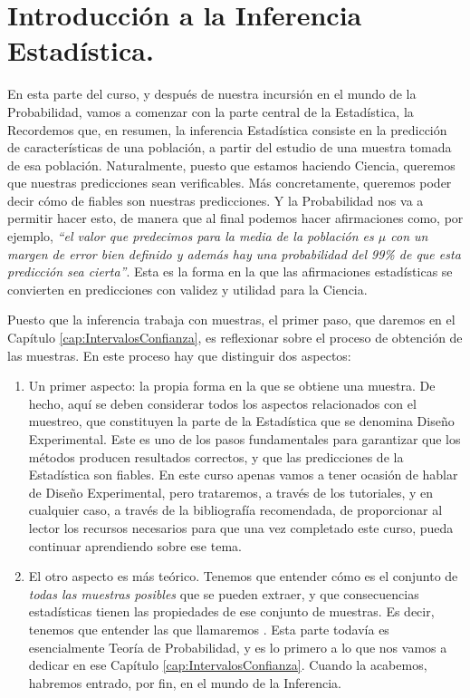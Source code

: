 
\section*{Introducción a la Inferencia Estadística.}
\label{part03:intro}


En esta parte del curso, y después de nuestra incursión en el mundo de la Probabilidad, vamos a comenzar con la parte central de la Estadística, la  Recordemos que, en resumen, la inferencia Estadística consiste en la predicción de características de una población, a partir del estudio de una muestra tomada de esa población. Naturalmente, puesto que estamos haciendo Ciencia, queremos que nuestras predicciones sean verificables. Más concretamente, queremos poder decir cómo de fiables son nuestras predicciones. Y la Probabilidad nos va a permitir hacer esto, de manera que al final podemos hacer afirmaciones como, por ejemplo, {\em ``el valor que predecimos para la media de la población es $\mu$ {\sf con un margen de error bien definido y además hay una probabilidad del 99\% de que esta predicción sea cierta}''}. Esta es la forma en la que las afirmaciones estadísticas se convierten en predicciones con validez y utilidad para la Ciencia.

Puesto que la inferencia trabaja con muestras, el primer paso, que daremos en el Capítulo \ref{cap:IntervalosConfianza}, es reflexionar sobre el proceso de obtención de las muestras. En este proceso hay que distinguir dos aspectos:

\begin{enumerate}
\item Un primer aspecto: la propia forma en la que se obtiene una muestra. De hecho, aquí se deben considerar todos los aspectos relacionados con el muestreo, que constituyen la parte de la Estadística que se denomina {\sf Diseño Experimental}. Este es uno de los pasos fundamentales para garantizar que los métodos producen resultados correctos, y que las predicciones de la Estadística son fiables. En este curso apenas vamos a tener ocasión de hablar de Diseño Experimental, pero trataremos, a través de los tutoriales, y en cualquier caso, a través de la bibliografía recomendada, de proporcionar al lector los recursos necesarios para que una vez completado este curso, pueda continuar aprendiendo sobre ese tema.
\item El otro aspecto es más teórico. Tenemos que entender cómo es el conjunto de {\em todas las muestras posibles} que se pueden extraer, y que consecuencias estadísticas tienen las propiedades de ese conjunto de muestras. Es decir, tenemos que entender las que llamaremos . Esta parte todavía es esencialmente Teoría de Probabilidad, y es lo primero a lo que nos vamos a dedicar en ese Capítulo \ref{cap:IntervalosConfianza}. Cuando la acabemos, habremos entrado, por fin, en el mundo de la Inferencia.
\end{enumerate}

